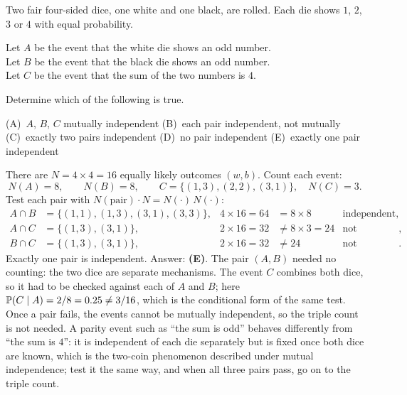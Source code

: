 \begin{example}
Two fair four-sided dice, one white and one black, are rolled. Each die shows $1$, $2$, $3$ or $4$ with equal probability.

Let $A$ be the event that the white die shows an odd number.\\
Let $B$ be the event that the black die shows an odd number.\\
Let $C$ be the event that the sum of the two numbers is $4$.

Determine which of the following is true.

\begin{center}
(A)~$A$, $B$, $C$ mutually independent \quad (B)~each pair independent, not mutually \quad (C)~exactly two pairs independent \quad (D)~no pair independent \quad (E)~exactly one pair independent
\end{center}
\end{example}
\begin{solution}
There are $N = 4 \times 4 = 16$ equally likely outcomes $(w, b)$. Count each event:
\[
N(A) = 8, \qquad N(B) = 8, \qquad C = \{(1,3), (2,2), (3,1)\}, \quad N(C) = 3.
\]
Test each pair with $N(\text{pair}) \cdot N = N(\cdot)\,N(\cdot)$:
\begin{align*}
A \cap B &= \{(1,1),(1,3),(3,1),(3,3)\}, & 4 \times 16 = 64 &= 8 \times 8 & \text{independent}, \\
A \cap C &= \{(1,3),(3,1)\}, & 2 \times 16 = 32 &\ne 8 \times 3 = 24 & \text{not independent}, \\
B \cap C &= \{(1,3),(3,1)\}, & 2 \times 16 = 32 &\ne 24 & \text{not independent}.
\end{align*}
Exactly one pair is independent. Answer: \textbf{(E)}. The pair $(A, B)$ needed no counting: the two dice are separate mechanisms. The event $C$ combines both dice, so it had to be checked against each of $A$ and $B$; here $\mathbb{P}(C \mid A) = 2/8 = 0.25 \ne 3/16$, which is the conditional form of the same test. Once a pair fails, the events cannot be mutually independent, so the triple count is not needed. A parity event such as ``the sum is odd'' behaves differently from ``the sum is $4$'': it is independent of each die separately but is fixed once both dice are known, which is the two-coin phenomenon described under mutual independence; test it the same way, and when all three pairs pass, go on to the triple count.
\end{solution}

